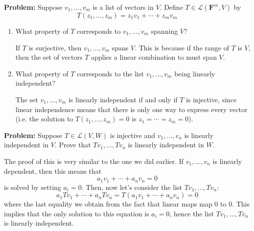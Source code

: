 \documentclass[10pt]{article}
\newcommand{\F}{\mathbf F}
\newenvironment{problem}{\textbf{Problem:}}{}
\begin{document}
	\begin{problem}
		Suppose \( v_1, \dots, v_m \) is a list of vectors in \( V \). Define \( T \in \mathcal L(\F^{m}, V) \) 
		by 
		\[
		T(z_1, \dots, z_m) = z_1v_1 + \cdots + z_m v_m
		\] 
		\begin{enumerate}[label=\alph*)]
			\item What property of \( T \) corresponds to \( v_1, \dots, v_m \) spanning \( V \)?

				\begin{solution}
					If \( T \) is surjective, then \( v_1, \dots, v_m \) spans \( V \). This is because if the range 
					of \( T \) is \( V \), then the set of vectors \( T \) applies a linear combination to 
					must span \( V \). 
				\end{solution}
			\item What property of \( T \) corresponds to the list \( v_1, \dots, v_m \) being linearly 
				independent?

				\begin{solution}
					The set \( v_1, \dots, v_m \) is linearly independent if and only if \( T \) is injective, since 
					linear independence means that there is only one way to express every vector (i.e. 
					the solution to \( T(z_1, \dots, z_m) = 0 \) is \( z_1 = \cdots = z_m  = 0 \)). 
				\end{solution}
		\end{enumerate}
	\end{problem}

	\begin{problem}
		Suppose \( T \in \mathcal L(V, W) \) is injective and \( v_1, \dots, v_n \) is linearly independent in \( V \).
		Prove that \( Tv_1, \dots, Tv_n \) is linearly independent in \( W \). 
	\end{problem}

	\begin{solution}
		The proof of this is very similar to the one we did earlier. If \( v_1, \dots, v_n \) is linearly dependent, 
		then this means that
		\[
		a_1v_1 + \cdots + a_nv_n = 0
		\] 
		is solved by setting \( a_i = 0 \). Then, now let's consider the list  \( Tv_1, \dots, Tv_n \):
		\[
		a_1Tv_1 + \cdots + a_n Tv_n = T(a_1v_1 + \cdots + a_nv_n) = 0
		\] 
		where the last equality we obtain from the fact that linear maps map 0 to 0. This implies that 
		the only solution to this equation is \( a_i = 0 \), hence the list \( Tv_1, \dots, Tv_n \) is 
		linearly independent.
	\end{solution}
\end{document}
